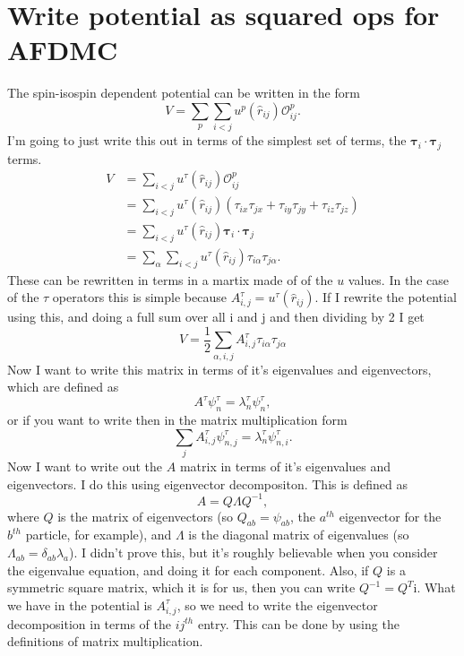 \documentclass[12pt]{extarticle}
\newcommand{\Oijp}{\mathcal{O}^p_{ij}}
\newcommand{\taui}{\bm{\tau}_i}
\newcommand{\tauj}{\bm{\tau}_j}
\newcommand{\rij}{\hat{r}_{ij}}
\newcommand{\tia}{\tau_{i\alpha}}
\newcommand{\tja}{\tau_{j\alpha}}
\newcommand{\Aijt}{A^{\tau}_{i,j}}
\begin{document}
\section*{Write potential as squared ops for AFDMC}
The spin-isospin dependent potential can be written in the form
\begin{equation}
   V = \sum\limits_p\sum\limits_{i<j} u^p(\rij)\Oijp.
\end{equation}
I'm going to just write this out in terms of the simplest set of terms, the $\taui\cdot\tauj$ terms.
\begin{align}
   V &= \sum\limits_{i<j} u^\tau(\rij)\Oijp \\
   &= \sum\limits_{i<j} u^\tau(\rij)\left(\tau_{ix}\tau_{jx}+\tau_{iy}\tau_{jy}+\tau_{iz}\tau_{jz}\right) \\
   &= \sum\limits_{i<j} u^\tau(\rij)\taui\cdot\tauj \\
   &= \sum\limits_\alpha\sum\limits_{i<j} u^\tau(\rij)\tia\tja.
\end{align}
These can be rewritten in terms in a martix made of of the $u$ values. In the case of the $\tau$ operators this is simple because $\Aijt=u^\tau(\rij)$. If I rewrite the potential using this, and doing a full sum over all i and j and then dividing by 2 I get
\begin{equation}
   V = \frac{1}{2}\sum\limits_{\alpha,i,j} \Aijt\tia\tja
\end{equation}
Now I want to write this matrix in terms of it's eigenvalues and eigenvectors, which are defined as
\begin{equation}
   A^{\tau}\psi_n^\tau=\lambda_n^\tau\psi_n^\tau,
\end{equation}
or if you want to write then in the matrix multiplication form
\begin{equation}
   \sum\limits_j\Aijt\psi_{n,j}^\tau = \lambda_n^\tau\psi_{n,i}^\tau.
\end{equation}
Now I want to write out the $A$ matrix in terms of it's eigenvalues and eigenvectors. I do this using eigenvector decompositon. This is defined as
\begin{equation}
   A=Q\Lambda Q^{-1},
\end{equation}
where $Q$ is the matrix of eigenvectors (so $Q_{ab}=\psi_{ab}$, the $a^{th}$ eigenvector for the $b^{th}$ particle, for example), and $\Lambda$ is the diagonal matrix of eigenvalues (so $\Lambda_{ab}=\delta_{ab}\lambda_a$). I didn't prove this, but it's roughly believable when you consider the eigenvalue equation, and doing it for each component. Also, if $Q$ is a symmetric square matrix, which it is for us, then you can write $Q^{-1}=Q^T$i. What we have in the potential is $\Aijt$, so we need to write the eigenvector decomposition in terms of the $ij^{th}$ entry. This can be done by using the definitions of matrix multiplication.
\end{document}
